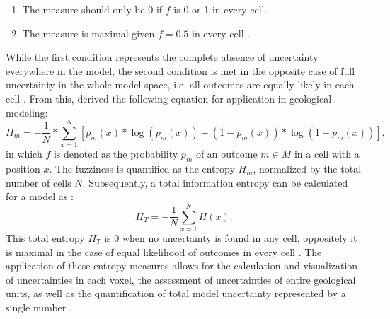         \begin{enumerate}
	        \item The measure should only be 0 if $f$ is 0 or 1 in every cell.
	        \item The measure is maximal given $f = 0.5$ in every cell \citep{wellmann2012uncertainties}.
        \end{enumerate}
        While the first condition represents the complete absence of uncertainty everywhere in the model, the second condition is met in the opposite case of full uncertainty in the whole model space, i.e. all outcomes are equally likely in each cell \citep{schaaf2017}. From this, \citet{wellmann2012uncertainties} derived the following equation for application in geological modeling:
        \begin{equation}
	        H_m = -\frac{1}{N}*\sum_{x=1}^{N}[p_m(x)*\log(p_m(x))+(1-p_m(x))*\log(1-p_m(x))],
        \end{equation}
        in which $f$ is denoted as the probability $p_m$ of an outcome $m\in M$ in a cell with a position $x$. The fuzziness is quantified as the entropy $H_m$, normalized by the total number of cells $N$. Subsequently, a total information entropy can be calculated for a model as \citep{wellmann2012uncertainties}:
        \begin{equation}
	        H_T = -\frac{1}{N}\sum_{x=1}^{N}H(x).
        \end{equation}
        This total entropy $H_T$ is 0 when no uncertainty is found in any cell, oppositely it is maximal in the case of equal likelihood of outcomes in every cell \citep{wellmann2012uncertainties, schaaf2017}. The application of these entropy measures allows for the calculation and visualization of uncertainties in each voxel, the assessment of uncertainties of entire geological units, as well as the quantification of total model uncertainty represented by a single number \citep{wellmann2012uncertainties}.
        
